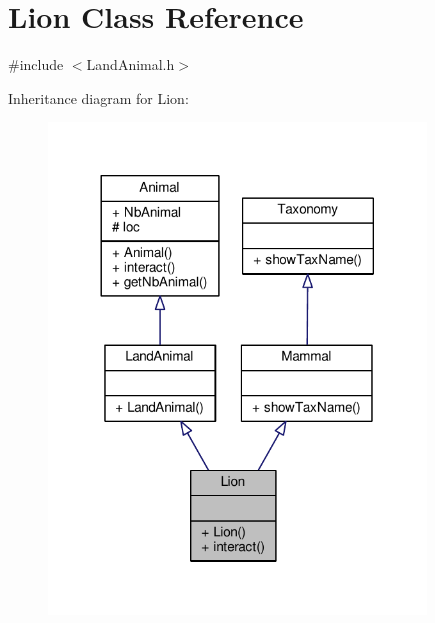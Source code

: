 \hypertarget{classLion}{}\section{Lion Class Reference}
\label{classLion}


{\ttfamily \#include $<$Land\+Animal.\+h$>$}



Inheritance diagram for Lion\+:
\nopagebreak
\begin{figure}[H]
\begin{center}
\leavevmode
\includegraphics[width=284pt]{classLion__inherit__graph}
\end{center}
\end{figure}


